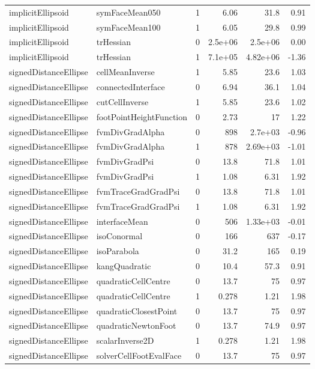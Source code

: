 \begin{tabular}{l l c r r r}
implicitEllipsoid & symFaceMean050 & 1 & 6.06 & 31.8 & 0.91 \\
implicitEllipsoid & symFaceMean100 & 1 & 6.05 & 29.8 & 0.99 \\
implicitEllipsoid & trHessian & 0 & 2.5e+06 & 2.5e+06 & 0.00 \\
implicitEllipsoid & trHessian & 1 & 7.1e+05 & 4.82e+06 & -1.36 \\
signedDistanceEllipse & cellMeanInverse & 1 & 5.85 & 23.6 & 1.03 \\
signedDistanceEllipse & connectedInterface & 0 & 6.94 & 36.1 & 1.04 \\
signedDistanceEllipse & cutCellInverse & 1 & 5.85 & 23.6 & 1.02 \\
signedDistanceEllipse & footPointHeightFunction & 0 & 2.73 & 17 & 1.22 \\
signedDistanceEllipse & fvmDivGradAlpha & 0 & 898 & 2.7e+03 & -0.96 \\
signedDistanceEllipse & fvmDivGradAlpha & 1 & 878 & 2.69e+03 & -1.01 \\
signedDistanceEllipse & fvmDivGradPsi & 0 & 13.8 & 71.8 & 1.01 \\
signedDistanceEllipse & fvmDivGradPsi & 1 & 1.08 & 6.31 & 1.92 \\
signedDistanceEllipse & fvmTraceGradGradPsi & 0 & 13.8 & 71.8 & 1.01 \\
signedDistanceEllipse & fvmTraceGradGradPsi & 1 & 1.08 & 6.31 & 1.92 \\
signedDistanceEllipse & interfaceMean & 0 & 506 & 1.33e+03 & -0.01 \\
signedDistanceEllipse & isoConormal & 0 & 166 & 637 & -0.17 \\
signedDistanceEllipse & isoParabola & 0 & 31.2 & 165 & 0.19 \\
signedDistanceEllipse & kangQuadratic & 0 & 10.4 & 57.3 & 0.91 \\
signedDistanceEllipse & quadraticCellCentre & 0 & 13.7 & 75 & 0.97 \\
signedDistanceEllipse & quadraticCellCentre & 1 & 0.278 & 1.21 & 1.98 \\
signedDistanceEllipse & quadraticClosestPoint & 0 & 13.7 & 75 & 0.97 \\
signedDistanceEllipse & quadraticNewtonFoot & 0 & 13.7 & 74.9 & 0.97 \\
signedDistanceEllipse & scalarInverse2D & 1 & 0.278 & 1.21 & 1.98 \\
signedDistanceEllipse & solverCellFootEvalFace & 0 & 13.7 & 75 & 0.97 \\

\end{tabular}
